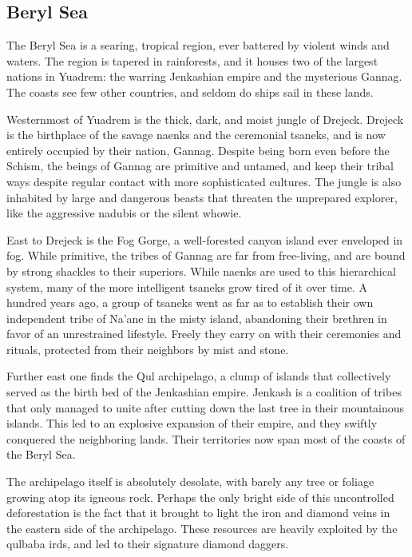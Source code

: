 \subsection*{Beryl Sea}
The Beryl Sea is a searing, tropical region, ever battered by violent winds and waters.
The region is tapered in rainforests, and it houses two of the largest nations in Yuadrem: the warring Jenkashian empire and the mysterious Gannag.
The coasts see few other countries, and seldom do ships sail in these lands.

Westernmost of Yuadrem is the thick, dark, and moist jungle of Drejeck.
Drejeck is the birthplace of the savage naenks and the ceremonial tsaneks, and is now entirely occupied by their nation, Gannag.
Despite being born even before the Schism, the beings of Gannag are primitive and untamed, and keep their tribal ways despite regular contact with more sophisticated cultures.
The jungle is also inhabited by large and dangerous beasts that threaten the unprepared explorer, like the aggressive nadubis or the silent whowie.

East to Drejeck is the Fog Gorge, a well-forested canyon island ever enveloped in fog.
While primitive, the tribes of Gannag are far from free-living, and are bound by strong shackles to their superiors.
While naenks are used to this hierarchical system, many of the more intelligent tsaneks grow tired of it over time.
A hundred years ago, a group of tsaneks went as far as to establish their own independent tribe of Na'ane in the misty island, abandoning their brethren in favor of an unrestrained lifestyle.
Freely they carry on with their ceremonies and rituals, protected from their neighbors by mist and stone.

Further east one finds the Qul archipelago, a clump of islands that collectively served as the birth bed of the Jenkashian empire.
Jenkash is a coalition of tribes that only managed to unite after cutting down the last tree in their mountainous islands.
This led to an explosive expansion of their empire, and they swiftly conquered the neighboring lands.
Their territories now span most of the coasts of the Beryl Sea.

The archipelago itself is absolutely desolate, with barely any tree or foliage growing atop its igneous rock.
Perhaps the only bright side of this uncontrolled deforestation is the fact that it brought to light the iron and diamond veins in the eastern side of the archipelago.
These resources are heavily exploited by the qulbaba irds, and led to their signature diamond daggers.

